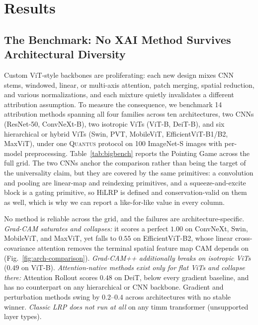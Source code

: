\documentclass[lettersize,journal]{IEEEtran}
\begin{document}
\section{Results}
\label{sec:results}

\subsection{The Benchmark: No XAI Method Survives Architectural Diversity}
\label{sec:baseline-landscape}
Custom ViT-style backbones are proliferating: each new design mixes CNN stems, windowed, linear, or multi-axis attention, patch merging, spatial reduction, and various normalizations, and each mixture quietly invalidates a different attribution assumption. To measure the consequence, we benchmark 14 attribution methods spanning all four families across ten architectures, two CNNs (ResNet-50, ConvNeXt-B), two isotropic ViTs (ViT-B, DeiT-B), and six hierarchical or hybrid ViTs (Swin, PVT, MobileViT, EfficientViT-B1/B2, MaxViT), under one \textsc{Quantus} protocol on 100 ImageNet-S images with per-model preprocessing. Table~\ref{tab:bigbench} reports the Pointing Game across the full grid. The two CNNs anchor the comparison rather than being the target of the universality claim, but they are covered by the same primitives: a convolution and pooling are linear-map and reindexing primitives, and a squeeze-and-excite block is a gating primitive, so HiLRP is defined and conservation-valid on them as well, which is why we can report a like-for-like value in every column.

No method is reliable across the grid, and the failures are architecture-specific. \emph{Grad-CAM saturates and collapses:} it scores a perfect $1.00$ on ConvNeXt, Swin, MobileViT, and MaxViT, yet falls to $0.55$ on EfficientViT-B2, whose linear cross-covariance attention removes the terminal spatial feature map CAM depends on (Fig.~\ref{fig:arch-comparison}). \emph{Grad-CAM++ additionally breaks on isotropic ViTs} ($0.49$ on ViT-B). \emph{Attention-native methods exist only for flat ViTs and collapse there:} Attention Rollout scores $0.48$ on DeiT, below every gradient baseline, and has no counterpart on any hierarchical or CNN backbone. Gradient and perturbation methods swing by $0.2$--$0.4$ across architectures with no stable winner. \emph{Classic LRP does not run at all} on any timm transformer (unsupported layer types).
\end{document}
